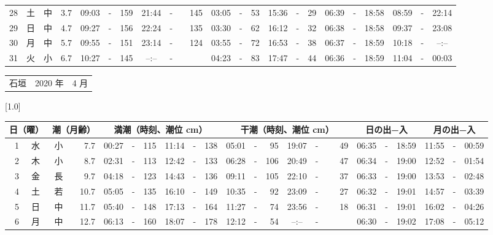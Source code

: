 \documentclass[12pt,a4j]{jsarticle}
\begin{document}
\begin{table}[htbp]
\begin{center}
{\begin{tabular}{|rc|cr|ccrccr|ccrccr|ccc|ccc|}
28 & 土 & 中 &  3.7 &  09:03 &-& 159 &  21:44 &-& 145 &  03:05 &-&  53 &  15:36 &-&  29 & 06:39 & -& 18:58 & 08:59 & -& 22:14 \\
29 & 日 & 中 &  4.7 &  09:27 &-& 156 &  22:24 &-& 135 &  03:30 &-&  62 &  16:12 &-&  32 & 06:38 & -& 18:58 & 09:37 & -& 23:08 \\
30 & 月 & 中 &  5.7 &  09:55 &-& 151 &  23:14 &-& 124 &  03:55 &-&  72 &  16:53 &-&  38 & 06:37 & -& 18:59 & 10:18 & -& --:-- \\
31 & 火 & 小 &  6.7 &  10:27 &-& 145 &  --:-- &-&~~~~~ &  04:23 &-&  83 &  17:47 &-&  44 & 06:36 & -& 18:59 & 11:04 & -& 00:03 \\
   \hline
   \end{tabular}}
   \end{center}
\end{table}
\newpage
 \begin{table}[htbp]
 \begin{center}
 \begin{tabular}{lcc}
 \LARGE{石垣}  & \large{2020 年} & \large{ 4 月} \\
 \end{tabular}
 \end{center}
 \begin{center}
    \scalebox{0.7}[1.0]{
    \begin{tabular}{|rc|cr|ccrccr|ccrccr|ccc|ccc|}
    \hline
    \multicolumn{2}{|c|}{日（曜）} & \multicolumn{2}{c|}{潮（月齢）} & \multicolumn{6}{c|}{満潮（時刻、潮位 cm）} & \multicolumn{6}{c|}{干潮（時刻、潮位 cm）} & \multicolumn{3}{c|}{日の出−入} &  \multicolumn{3}{c|}{月の出−入}\\
 \hline
 1 & 水 & 小 &  7.7 &  00:27 &-& 115 &  11:14 &-& 138 &  05:01 &-&  95 &  19:07 &-&  49 & 06:35 & -& 18:59 & 11:55 & -& 00:59 \\
 2 & 木 & 小 &  8.7 &  02:31 &-& 113 &  12:42 &-& 133 &  06:28 &-& 106 &  20:49 &-&  47 & 06:34 & -& 19:00 & 12:52 & -& 01:54 \\
 3 & 金 & 長 &  9.7 &  04:18 &-& 123 &  14:43 &-& 136 &  09:11 &-& 105 &  22:10 &-&  37 & 06:33 & -& 19:00 & 13:53 & -& 02:48 \\
 4 & 土 & 若 & 10.7 &  05:05 &-& 135 &  16:10 &-& 149 &  10:35 &-&  92 &  23:09 &-&  27 & 06:32 & -& 19:01 & 14:57 & -& 03:39 \\
 5 & 日 & 中 & 11.7 &  05:40 &-& 148 &  17:13 &-& 164 &  11:27 &-&  74 &  23:56 &-&  18 & 06:31 & -& 19:01 & 16:02 & -& 04:26 \\
 6 & 月 & 中 & 12.7 &  06:13 &-& 160 &  18:07 &-& 178 &  12:12 &-&  54 &  --:-- &-&~~~~~ & 06:30 & -& 19:02 & 17:08 & -& 05:12 \\

\end{tabular}}
\end{center}
\end{table}
\end{document}
